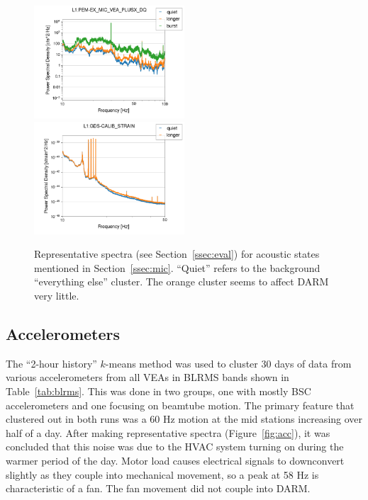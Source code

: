 \documentclass[colorlinks=true,pdfstartview=FitV,linkcolor=blue,
            citecolor=red,urlcolor=magenta]{ligodoc}
\begin{document}
\begin{figure}
  \includegraphics[width=0.5\textwidth]{assets/final/L1_PEM-EX_MIC_VEA_PLUSX_DQ.png}
  \includegraphics[width=0.5\textwidth]{assets/final/L1_GDS-CALIB_STRAIN-mic.png}
  \caption{Representative spectra (see Section~\ref{ssec:eval}) for acoustic states mentioned in Section~\ref{ssec:mic}. ``Quiet'' refers to the background ``everything else'' cluster. The orange cluster seems to affect DARM very little.}\label{fig:mic}
\end{figure}


\subsection{Accelerometers}
The ``2-hour history'' $k$-means method was used to cluster 30 days of data from various accelerometers from all VEAs in BLRMS bands shown in Table~\ref{tab:blrms}.
This was done in two groups, one with mostly BSC accelerometers and one focusing on beamtube motion.
The primary feature that clustered out in both runs was a 60 Hz motion at the mid stations increasing over half of a day.
After making representative spectra (Figure~\ref{fig:acc}), it was concluded that this noise was due to the HVAC system turning on during the warmer period of the day.
Motor load causes electrical signals to downconvert slightly as they couple into mechanical movement, so a peak at 58 Hz is characteristic of a fan.
The fan movement did not couple into DARM.
\end{document}

